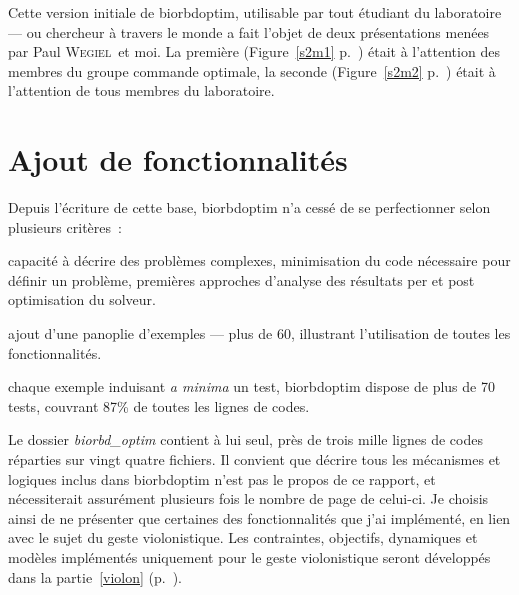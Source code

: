 Cette version initiale de \gls{biorbdoptim}, utilisable par tout étudiant du laboratoire --- ou chercheur à travers le monde a fait l'objet de deux présentations menées par Paul \textsc{Wegiel} et moi. La première (Figure~\ref{s2m1} p.~\pageref{s2m1}) était à l'attention des membres du groupe commande optimale, la seconde (Figure~\ref{s2m2} p.~\pageref{s2m2}) était à l'attention de tous membres du laboratoire.



    \chapter{Ajout de fonctionnalités}
    
Depuis l'écriture de cette base, \gls{biorbdoptim} n'a cessé de se perfectionner selon plusieurs critères~:
\begin{description}
\setlength\itemsep{-0.5em}
\item[Fonctionnalités :] capacité à décrire des problèmes complexes, minimisation du code nécessaire pour définir un problème, premières approches d'analyse des résultats per et post optimisation du solveur.
\item[Couverture des exemples :] ajout d'une panoplie d'exemples --- plus de 60, illustrant l'utilisation de toutes les fonctionnalités.
\item[Stabilité :] chaque exemple induisant \emph{a minima} un test, \gls{biorbdoptim} dispose de plus de 70 tests, couvrant 87\% de toutes les lignes de codes.
\end{description}

Le dossier \emph{biorbd\_optim} contient à lui seul, près de trois mille lignes de codes réparties sur vingt  quatre fichiers. Il convient que décrire tous les mécanismes et logiques inclus dans \gls{biorbdoptim} n'est pas le propos de ce rapport, et nécessiterait assurément plusieurs fois le nombre de page de celui-ci. Je choisis ainsi de ne présenter que certaines des fonctionnalités que j'ai implémenté, en lien avec le sujet du geste violonistique. Les contraintes, objectifs, dynamiques et modèles implémentés uniquement pour le geste violonistique seront développés dans la partie~\ref{violon} (p.~\pageref{violon}).

